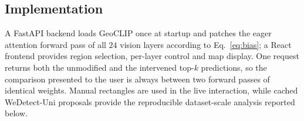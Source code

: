 \subsection{Implementation}

A FastAPI backend loads GeoCLIP once at startup and patches the eager
attention forward pass of all $24$ vision layers according to
Eq.~\ref{eq:bias}; a React frontend provides region selection, per-layer
control and map display. One request returns both the unmodified and the
intervened top-$k$ predictions, so the comparison presented to the user is
always between two forward passes of identical weights. Manual rectangles
are used in the live interaction, while cached WeDetect-Uni proposals provide
the reproducible dataset-scale analysis reported below.
